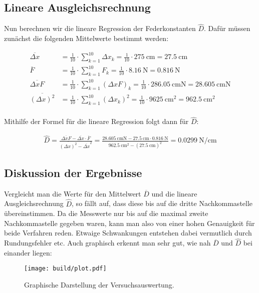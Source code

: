 \subsection{Lineare Ausgleichsrechnung}
Nun berechnen wir die lineare Regression der Federkonstanten $\hat{D}$.
Dafür müssen zunächst die folgenden Mittelwerte bestimmt werden:

\begin{align}
    \overline{\Delta x} &=\frac{1}{10} \cdot \sum_{k=1}^{10} \Delta x_k = \frac{1}{10} \cdot \qty{275}{\cm} = \qty{27.5}{\cm} \\
    \overline{F} &=\frac{1}{10} \cdot \sum_{k=1}^{10} F_k = \frac{1}{10} \cdot \qty{8.16}{\newton}= \qty{0.816}{\newton} \\
    \overline{\Delta x F} &=\frac{1}{10} \cdot \sum_{k=1}^{10} \left(\Delta x F\right)_k = \frac{1}{10} \cdot \qty{286.05}{\cm\newton}= \qty{28.605}{\cm\newton} \\
    \overline{\left(\Delta x\right)^2} &=\frac{1}{10} \cdot \sum_{k=1}^{10} \left(\Delta x_k\right)^2 = \frac{1}{10} \cdot \qty{9625}{\cm^2}= \qty{962.5}{\cm^2} \\
\end{align}


Mithilfe der Formel für die lineare Regression folgt dann für $\hat{D}$:

\begin{align}
    \hat{D} = \frac{\overline{\Delta x F} - \overline{\Delta x} \cdot \overline{F}}{\overline{\left(\Delta x\right)^2} - {\overline{\Delta x}}^2}
    = \frac{\qty{28.605}{\cm\newton} - \qty{27.5}{\cm} \cdot \qty{0.816}{\newton}}{\qty{962.5}{\cm^2} - \left({\qty{27.5}{\cm}}\right)^2}
    = \qty[]{0.0299}{\newton\per\cm}
\end{align}

\subsection{Diskussion der Ergebnisse}
Vergleicht man die Werte für den Mittelwert $\overline{D}$ und die lineare Ausgleichsrechnung $\hat{D}$, so fällt auf, 
dass diese bis auf die dritte Nachkommastelle übereinstimmen.   
Da die Messwerte nur bis auf die maximal zweite Nachkommastelle gegeben waren,
kann man also von einer hohen Genauigkeit für beide Verfahren reden. 
Etwaige Schwankungen entstehen dabei vermutlich durch Rundungsfehler etc.
Auch graphisch erkennt man sehr gut, wie nah $\overline{D}$ und $\hat{D}$ bei einander liegen:

\begin{figure}
    \centering
        \texttt{[image: build/plot.pdf]}
    \caption{Graphische Darstellung der Versuchsauswertung.}
    \label{fig:plot}
    \end{figure}
    

